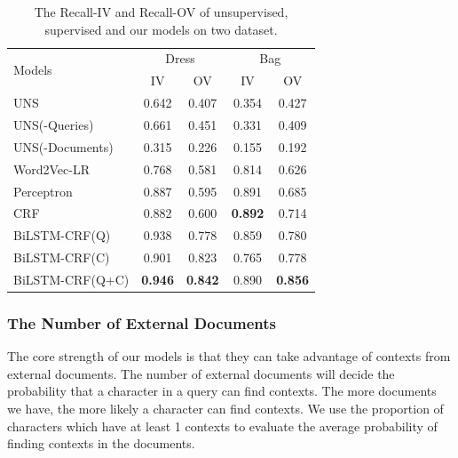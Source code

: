 \begin{table}[th]
	\centering
	\small
	\caption{\small The Recall-IV and Recall-OV of unsupervised, supervised and our models on two dataset.}
	\begin{tabular}{lcccc}
		\toprule
		\multirow{2}{*}{Models} & \multicolumn{2}{c}{Dress} & \multicolumn{2}{c}{Bag}                                   \\
		\cmidrule(lr){2-3} \cmidrule(lr){4-5}
		                        & IV                        & OV                      & IV             & OV             \\
		\midrule
		UNS                     & 0.642                     & 0.407                   & 0.354          & 0.427          \\
		UNS(-Queries)           & 0.661                     & 0.451                   & 0.331          & 0.409          \\
		UNS(-Documents)         & 0.315                     & 0.226                   & 0.155          & 0.192          \\

		\midrule
		Word2Vec-LR             & 0.768                     & 0.581                   & 0.814          & 0.626          \\
		Perceptron              & 0.887                     & 0.595                   & 0.891          & 0.685          \\
		CRF                     & 0.882                     & 0.600                   & \textbf{0.892} & 0.714          \\
		BiLSTM-CRF(Q)           & 0.938                     & 0.778                   & 0.859          & 0.780          \\
		\midrule
		BiLSTM-CRF(C)           & 0.901                     & 0.823                   & 0.765          & 0.778          \\
		BiLSTM-CRF(Q+C)         & \textbf{0.946}            & \textbf{0.842}          & 0.890          & \textbf{0.856} \\
		\bottomrule
	\end{tabular}
	\label{tab:oov}
\end{table}


\subsubsection{The Number of External Documents}

The core strength of our models is that they can take advantage of contexts from external documents. The number of external documents will decide the probability that a character in a query can find contexts. The more documents we have, the more likely a character can find contexts. We use the proportion of characters which have at least 1 contexts to evaluate the average probability of finding contexts in the documents.

